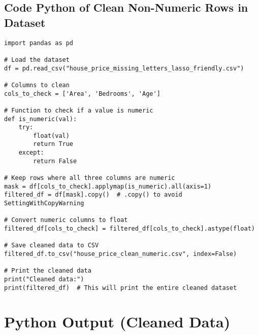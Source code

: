 \documentclass[12pt, a4paper]{report}
\begin{document}
\subsection*{Code Python of Clean Non-Numeric Rows in Dataset}

\begin{lstlisting}[style=pythonstyle]
import pandas as pd

# Load the dataset
df = pd.read_csv("house_price_missing_letters_lasso_friendly.csv")

# Columns to clean
cols_to_check = ['Area', 'Bedrooms', 'Age']

# Function to check if a value is numeric
def is_numeric(val):
    try:
        float(val)
        return True
    except:
        return False

# Keep rows where all three columns are numeric
mask = df[cols_to_check].applymap(is_numeric).all(axis=1)
filtered_df = df[mask].copy()  # .copy() to avoid SettingWithCopyWarning

# Convert numeric columns to float
filtered_df[cols_to_check] = filtered_df[cols_to_check].astype(float)

# Save cleaned data to CSV
filtered_df.to_csv("house_price_clean_numeric.csv", index=False)

# Print the cleaned data
print("Cleaned data:")
print(filtered_df)  # This will print the entire cleaned dataset
\end{lstlisting}
\newpage
\section*{Python Output (Cleaned Data)}
\end{document}
